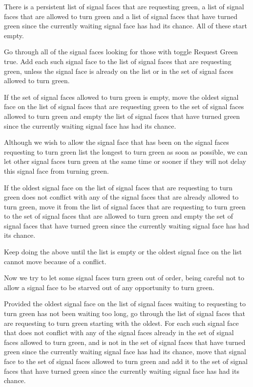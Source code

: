 \documentclass[letterpaper,twoside]{article}
\begin{document}
There is a persistent list of signal faces that are requesting green,
a list of signal faces that are allowed to turn green and a list of signal
faces that have turned green since the currently waiting signal face
has had its chance.
All of these start empty.

Go through all of the signal faces looking for those with toggle Request
Green true.  Add each such signal face to the list of
signal faces that are requesting green, unless the signal face is already on
the list or in the set of signal faces allowed to turn green.

If the set of signal faces allowed to turn green is empty, move the
oldest signal face on the list of signal faces that are requesting
green to the set of signal faces allowed to turn green and empty the list
of signal faces that have turned green since the currently waiting
signal face has had its chance.

Although we wish to allow the signal face that has been on the
signal faces requesting to turn green list the longest to turn green
as soon as possible, we can let other signal faces turn green
at the same time or sooner if they will not delay this signal face
from turning green.

If the oldest signal face on the list of signal faces that are
requesting to turn green does not conflict with any of the signal
faces that are already allowed to turn green, move it from the
list of signal faces that are requesting to turn green to the set
of signal faces that are allowed to turn green and empty the set
of signal faces that have turned green since the currently waiting
signal face has had its chance.

Keep doing the above until the list is empty or the oldest signal
face on the list cannot move because of a conflict.

Now we try to let some signal faces turn green out of order, being
careful not to allow a signal face to be starved out of any
opportunity to turn green.

Provided the oldest signal face on the list of signal faces
waiting to requesting to turn green has not been waiting too long,
go through the list of signal faces that are requesting to turn green
starting with the oldest.  For each such signal face that does not
conflict with any of the signal faces already in the set of signal
faces allowed to turn green, and is not in the set of signal faces
that have turned green since the currently waiting signal face has
had its chance, move that signal face to the set of signal faces
allowed to turn green and add it to the set of signal faces that have
turned green since the currently waiting signal face has had its
chance.
\end{document}
